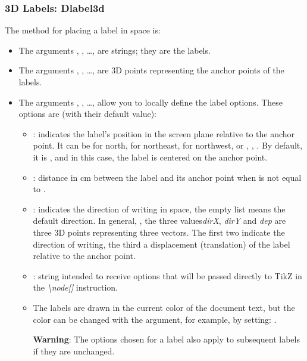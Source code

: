 \subsubsection{3D Labels: Dlabel3d}

The method for placing a label in space is:


\begin{itemize}
    \item The arguments , , \ldots, are strings; they are the labels.

    \item The arguments , , \ldots, are 3D points representing the anchor points of the labels.

     \item The arguments , , \ldots, allow you to locally define the label options. These options are (with their default value):

\begin{itemize}
    \item {}: indicates the label's position in the screen plane relative to the anchor point. It can be  for north,  for northeast,  for northwest, or , , . By default, it is , and in this case, the label is centered on the anchor point.

     \item {}: distance in cm between the label and its anchor point when  is not equal to .

    \item {}: indicates the direction of writing in space, the empty list means the default direction. In general, , the three values ​​\emph{dirX}, \emph{dirY} and \emph{dep} are three 3D points representing three vectors. The first two indicate the direction of writing, the third a displacement (translation) of the label relative to the anchor point.

    \item {}: string intended to receive options that will be passed directly to TikZ in the \emph{\textbackslash node[]} instruction.

    \item The labels are drawn in the current color of the document text, but the color can be changed with the  argument, for example, by setting: .

\textbf{Warning}: The options chosen for a label also apply to subsequent labels if they are unchanged.
\end{itemize}
\end{itemize}

